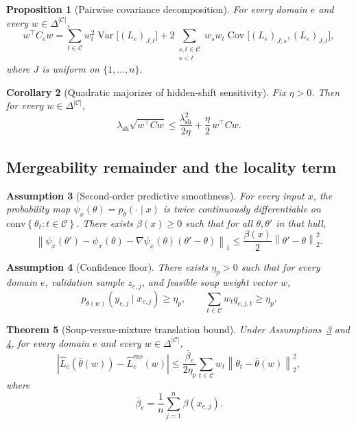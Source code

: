 \documentclass{article}
\newtheorem{theorem}{Theorem}[section]
\newtheorem{proposition}[theorem]{Proposition}
\newtheorem{corollary}[theorem]{Corollary}
\newtheorem{assumption}[theorem]{Assumption}
\theoremstyle{definition}
\newcommand{\cC}{\mathcal{C}}
\newcommand{\simplex}{\Delta}
\newcommand{\norm}[1]{\left\lVert #1 \right\rVert}
\newcommand{\abs}[1]{\left\lvert #1 \right\rvert}
\newcommand{\braces}[1]{\left\{ #1 \right\}}
\newcommand{\thetaw}{\bar{\theta}(w)}
\begin{document}
\begin{proposition}[Pairwise covariance decomposition]
\label{prop:pairwise_covariance}
For every domain \(e\) and every \(w\in\simplex^{|\cC|}\),
\begin{equation}
w^\top C_e w
=
\sum_{t\in\cC} w_t^2 \operatorname{Var}\!\big[(L_e)_{J,t}\big]
+
2\sum_{\substack{s,t\in\cC\\ s<t}} w_s w_t \operatorname{Cov}\!\big[(L_e)_{J,s}, (L_e)_{J,t}\big],
\label{eq:pairwise_covariance}
\end{equation}
where \(J\) is uniform on \(\{1,\dots,n\}\).
\end{proposition}

\begin{corollary}[Quadratic majorizer of hidden-shift sensitivity]
\label{cor:young}
Fix \(\eta>0\). Then for every \(w\in\simplex^{|\cC|}\),
\begin{equation}
\lambda_{\mathrm{sh}}\sqrt{w^\top Cw}
\le
\frac{\lambda_{\mathrm{sh}}^2}{2\eta}
+
\frac{\eta}{2}\,w^\top Cw.
\label{eq:young_majorizer}
\end{equation}
\end{corollary}

\subsection{Mergeability remainder and the locality term}

\begin{assumption}[Second-order predictive smoothness]
\label{ass:smooth}
For every input \(x\), the probability map \(\psi_x(\theta)=p_\theta(\cdot\mid x)\) is twice continuously differentiable on \(\mathrm{conv}\braces{\theta_t:t\in\cC}\). There exists \(\beta(x)\ge 0\) such that for all \(\theta,\theta'\) in that hull,
\[
\norm{
\psi_x(\theta')-\psi_x(\theta)-\nabla\psi_x(\theta)(\theta'-\theta)
}_1
\le
\frac{\beta(x)}{2}\norm{\theta'-\theta}_2^2.
\]
\end{assumption}

\begin{assumption}[Confidence floor]
\label{ass:conf_floor}
There exists \(\eta_p>0\) such that for every domain \(e\), validation sample \(z_{e,j}\), and feasible soup weight vector \(w\),
\[
p_{\thetaw}(y_{e,j}\mid x_{e,j}) \ge \eta_p,
\qquad
\sum_{t\in\cC} w_t q_{e,j,t}\ge \eta_p.
\]
\end{assumption}

\begin{theorem}[Soup-versus-mixture translation bound]
\label{thm:soup_mix}
Under Assumptions~\ref{ass:smooth} and \ref{ass:conf_floor}, for every domain \(e\) and every \(w\in \simplex^{|\cC|}\),
\begin{equation}
\abs{
\widehat L_e(\thetaw)-\widehat L_e^{\mathrm{ens}}(w)
}
\le
\frac{\bar\beta_e}{2\eta_p}
\sum_{t\in\cC} w_t \norm{\theta_t-\thetaw}_2^2,
\label{eq:soup_mix_bound}
\end{equation}
where
\[
\bar\beta_e = \frac{1}{n}\sum_{j=1}^{n}\beta(x_{e,j}).
\]
\end{theorem}
\end{document}
